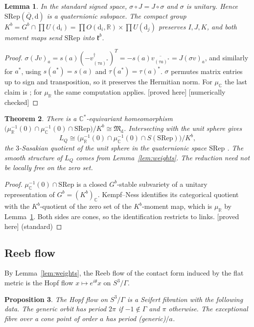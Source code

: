 \documentclass[11pt]{article}
\newtheorem{theorem}{Theorem}[section]
\newtheorem{proposition}[theorem]{Proposition}
\newtheorem{lemma}[theorem]{Lemma}
\theoremstyle{definition}
\theoremstyle{remark}
\newcommand{\tagP}{\textsf{\small[proved here]}}
\newcommand{\tagN}{\textsf{\small[numerically checked]}}
\newcommand{\C}{\mathbb{C}}\newcommand{\R}{\mathbb{R}}\newcommand{\Z}{\mathbb{Z}}
\newcommand{\M}{\mathfrak{M}}\newcommand{\Rep}{\mathrm{Rep}}\newcommand{\SRep}{\mathrm{SRep}}
\begin{document}
\begin{lemma}\label{lem:quat}
In the standard signed space, $\sigma\circ J=J\circ\sigma$ and $\sigma$ is unitary. Hence $\SRep(\overline Q,\mathrm d)$ is a quaternionic subspace. The compact group $K^b=G^b\cap\prod U(\mathrm d_i)=\prod O(\mathrm d_i,\R)\times\prod U(\mathrm d_j)$ preserves $I,J,K$, and both moment maps send $\SRep$ into $\mathfrak k^b$.
\end{lemma}
\begin{proof}
$\sigma(Jv)_a=s(a)(-v_{(\tau a)^*}^\dagger)^T=-s(a)\overline{v_{(\tau a)^*}}=J(\sigma v)_a$, and similarly for $a^*$, using $s(a^*)=s(a)$ and $\tau(a^*)=\tau(a)^*$. $\sigma$ permutes matrix entries up to sign and transposition, so it preserves the Hermitian norm. For $\mu_\C$ the last claim is \cite[Prop.~2.11]{Pinot}; for $\mu_\R$ the same computation applies. \tagP{} \tagN
\end{proof}

\begin{theorem}\label{thm:D}
There is a $\C^*$-equivariant homeomorphism $\bigl(\mu_\R^{-1}(0)\cap\mu_\C^{-1}(0)\cap\SRep\bigr)/K^b\cong\M_{\mathrm d}$. Intersecting with the unit sphere gives
\[L_Q\cong\bigl(\mu_\R^{-1}(0)\cap\mu_\C^{-1}(0)\cap S(\SRep)\bigr)/K^b,\]
the $3$-Sasakian quotient of the unit sphere in the quaternionic space $\SRep$ \cite{BGM,BG98}. The smooth structure of $L_Q$ comes from Lemma~\ref{lem:weights}. The reduction need not be locally free on the zero set.
\end{theorem}
\begin{proof}
$\mu_\C^{-1}(0)\cap\SRep$ is a closed $G^b$-stable subvariety of a unitary representation of $G^b=(K^b)_\C$. Kempf--Ness \cite{KN} identifies its categorical quotient with the $K^b$-quotient of the zero set of the $K^b$-moment map, which is $\mu_\R$ by Lemma~\ref{lem:quat}. Both sides are cones, so the identification restricts to links. \tagP{} (standard)
\end{proof}

\subsection{Reeb flow}
By Lemma~\ref{lem:weights}, the Reeb flow of the contact form induced by the flat metric is the Hopf flow $x\mapsto e^{i\theta}x$ on $S^3/\Gamma$.

\begin{proposition}\label{prop:seifert}
The Hopf flow on $S^3/\Gamma$ is a Seifert fibration with the following data. The generic orbit has period $2\pi$ if $-1\notin\Gamma$ and $\pi$ otherwise. The exceptional fibre over a cone point of order $a$ has period (generic)$/a$.
\end{proposition}
\end{document}
